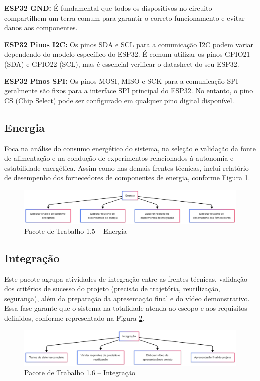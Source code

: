 \textbf{ESP32 GND:} É fundamental que todos os dispositivos no circuito compartilhem um terra comum para garantir o correto funcionamento e evitar danos aos componentes.

\textbf{ESP32 Pinos I2C:} Os pinos SDA e SCL para a comunicação I2C podem variar dependendo do modelo específico do ESP32. É comum utilizar os pinos GPIO21 (SDA) e GPIO22 (SCL), mas é essencial verificar o datasheet do seu ESP32.

\textbf{ESP32 Pinos SPI:} Os pinos MOSI, MISO e SCK para a comunicação SPI geralmente são fixos para a interface SPI principal do ESP32. No entanto, o pino CS (Chip Select) pode ser configurado em qualquer pino digital disponível.


\subsection{Energia}

Foca na análise do consumo energético do sistema, na seleção e validação da fonte de alimentação e na condução de experimentos relacionados à autonomia e estabilidade energética. Assim como nas demais frentes técnicas, inclui relatório de desempenho dos fornecedores de componentes de energia, conforme Figura \ref{fig_eap_energia}.

\begin{figure}[!h]
	\centering
\includegraphics[width=15cm]{figuras/eap_energia.png}
	\caption{Pacote de Trabalho 1.5 – Energia}
	\label{fig_eap_energia} 
\end{figure}


\newpage

\subsection{Integração}


Este pacote agrupa atividades de integração entre as frentes técnicas, validação dos critérios de sucesso do projeto (precisão de trajetória, reutilização, segurança), além da preparação da apresentação final e do vídeo demonstrativo. Essa fase garante que o sistema na totalidade atenda ao escopo e aos requisitos definidos, conforme representado na Figura \ref{fig_eap_integracao}.

\begin{figure}[!h]
	\centering
\includegraphics[width=15cm]{figuras/eap_integracao.png}
	\caption{Pacote de Trabalho 1.6 – Integração}
	\label{fig_eap_integracao}  
\end{figure}
